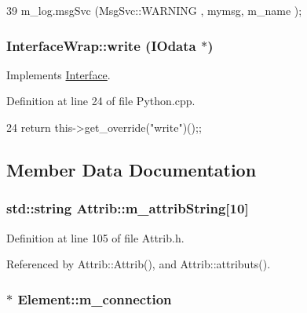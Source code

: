 \begin{DoxyCode}
39 { m_log.msgSvc (MsgSvc::WARNING , mymsg, m_name ); }
\end{DoxyCode}
\hypertarget{structInterfaceWrap_afbf6658c8be109e72f38d61438ec94d3}{
\subsubsection[{write}]{ InterfaceWrap::write ({\bf IOdata} $\ast$)}}
\label{structInterfaceWrap_afbf6658c8be109e72f38d61438ec94d3}


Implements \hyperlink{classInterface_ad665cacbaf490a26c1c4ba192022e68a}{Interface}.

Definition at line 24 of file Python.cpp.


\begin{DoxyCode}
24 {return this->get_override("write")();};
\end{DoxyCode}


\subsection{Member Data Documentation}
\hypertarget{classAttrib_a3414521d7a82476e874b25a5407b5e63}{
\subsubsection[{m\_\-attribString}]{\setlength{\rightskip}{0pt plus 5cm}std::string {\bf Attrib::m\_\-attribString}\mbox{[}10\mbox{]}}}
\label{classAttrib_a3414521d7a82476e874b25a5407b5e63}


Definition at line 105 of file Attrib.h.

Referenced by Attrib::Attrib(), and Attrib::attributs().\hypertarget{classElement_abe3de7a5dbbc9a6dd2d7e012e5fdb266}{
\subsubsection[{m\_\-connection}]{$\ast$ {\bf Element::m\_\-connection}}}
\label{classElement_abe3de7a5dbbc9a6dd2d7e012e5fdb266}


